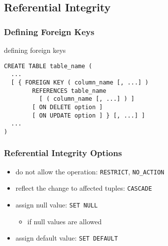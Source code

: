 \documentclass[dvipsnames]{beamer}
\theoremstyle{plain}
\begin{document}
\subsection{Referential Integrity}

\begin{frame}[fragile]
  \frametitle{Defining Foreign Keys}

  \begin{block}{defining foreign keys}
    \begin{lstlisting}
CREATE TABLE table_name (
  ...
  [ { FOREIGN KEY ( column_name [, ...] )
        REFERENCES table_name
          [ ( column_name [, ...] ) ]
        [ ON DELETE option ]
        [ ON UPDATE option ] } [, ...] ]
  ...
)
    \end{lstlisting}
  \end{block}
\end{frame}

\begin{frame}
  \frametitle{Referential Integrity Options}

  \begin{itemize}
    \item do not allow the operation: \texttt{RESTRICT}, \texttt{NO\_ACTION}

    \pause
    \item reflect the change to affected tuples: \texttt{CASCADE}

    \pause
    \item assign null value: \texttt{SET NULL}
    \begin{itemize}
      \item if null values are allowed
    \end{itemize}

    \pause
    \item assign default value: \texttt{SET DEFAULT}
  \end{itemize}
\end{frame}
\end{document}
